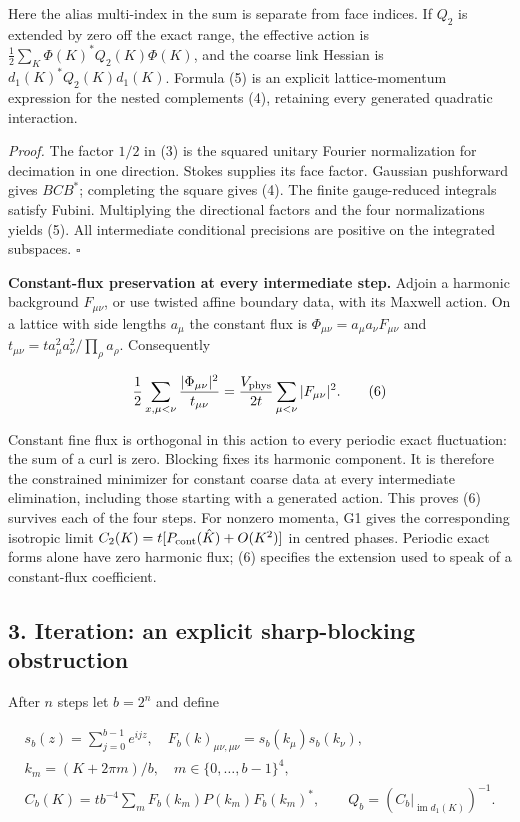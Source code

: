 \documentclass[11pt,a4paper]{article}
\begin{document}
Here the alias multi-index in the sum is separate from face indices. If
\(Q_2\) is extended by zero off the exact range, the effective action is
\(\tfrac12\sum_K\Phi(K)^*Q_2(K)\Phi(K)\), and the coarse link Hessian is
\(d_1(K)^*Q_2(K)d_1(K)\). Formula (5) is an explicit lattice-momentum
expression for the nested complements (4), retaining every generated
quadratic interaction.

\emph{Proof.} The factor \(1/2\) in (3) is the squared unitary Fourier
normalization for decimation in one direction. Stokes supplies its face
factor. Gaussian pushforward gives \(BCB^*\); completing the square
gives (4). The finite gauge-reduced integrals satisfy Fubini.
Multiplying the directional factors and the four normalizations yields
(5). All intermediate conditional precisions are positive on the
integrated subspaces. \(\square\)

\textbf{Constant-flux preservation at every intermediate step.} Adjoin a
harmonic background \(F_{\mu\nu}\), or use twisted affine boundary data,
with its Maxwell action. On a lattice with side lengths \(a_\mu\) the
constant flux is \(\Phi_{\mu\nu}=a_\mu a_\nu F_{\mu\nu}\) and
\(t_{\mu\nu}=t a_\mu^2a_\nu^2/\prod_\rho a_\rho\). Consequently

\[\frac12\sum_{x,\mu<\nu}\frac{|\Phi_{\mu\nu}|^2}{t_{\mu\nu}}
 =\frac{V_{\rm phys}}{2t}\sum_{\mu<\nu}|F_{\mu\nu}|^2. \tag{6}\]

Constant fine flux is orthogonal in this action to every periodic exact
fluctuation: the sum of a curl is zero. Blocking fixes its harmonic
component. It is therefore the constrained minimizer for constant coarse
data at every intermediate elimination, including those starting with a
generated action. This proves (6) survives each of the four steps. For
nonzero momenta, G1 gives the corresponding isotropic limit
\(C_2(K)=t[P_{\rm cont}(\hat K)+O(K^2)]\) in centred phases. Periodic
exact forms alone have zero harmonic flux; (6) specifies the extension
used to speak of a constant-flux coefficient.

\hypertarget{iteration-an-explicit-sharp-blocking-obstruction}{%
\subsection{3. Iteration: an explicit sharp-blocking
obstruction}\label{iteration-an-explicit-sharp-blocking-obstruction}}

After \(n\) steps let \(b=2^n\) and define

\[\begin{gathered}
 s_b(z)=\sum_{j=0}^{b-1}e^{ijz},\quad
 F_b(k)_{\mu\nu,\mu\nu}=s_b(k_\mu)s_b(k_\nu),\\
 k_m=(K+2\pi m)/b,\quad m\in\{0,\ldots,b-1\}^4,\\
 C_b(K)=t b^{-4}\sum_m F_b(k_m)P(k_m)F_b(k_m)^*,\qquad
 Q_b=(C_b|_{\operatorname{im}d_1(K)})^{-1}. \tag{7}
\end{gathered}\]
\end{document}
